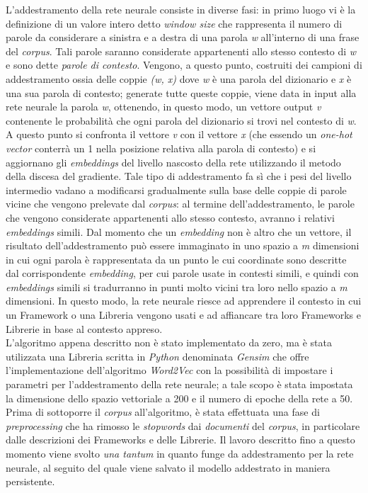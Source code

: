 L'addestramento della rete neurale consiste in diverse fasi: in primo luogo vi è la definizione di un valore intero detto \emph{window size} che rappresenta il numero di parole da considerare a sinistra e a destra di una parola \emph{w} all'interno di una frase del \emph{corpus}. Tali parole saranno considerate appartenenti allo stesso contesto di \emph{w} e sono dette \emph{parole di contesto}. Vengono, a questo punto, costruiti dei campioni di addestramento ossia delle coppie \emph{(w, x)} dove \emph{w} è una parola del dizionario e \emph{x} è una sua parola di contesto; generate tutte queste coppie, viene data in input alla rete neurale la parola \emph{w}, ottenendo, in questo modo, un vettore output \emph{v} contenente le probabilità che ogni parola del dizionario si trovi nel contesto di \emph{w}. A questo punto si confronta il vettore \emph{v} con il vettore \emph{x} (che essendo un \emph{one-hot vector} conterrà un 1 nella posizione relativa alla parola di contesto) e si aggiornano gli \emph{embeddings} del livello nascosto della rete utilizzando il metodo della discesa del gradiente. Tale tipo di addestramento fa sì che i pesi del livello intermedio vadano a modificarsi gradualmente sulla base delle coppie di parole vicine che vengono prelevate dal \emph{corpus}: al termine dell'addestramento, le parole che vengono considerate appartenenti allo stesso contesto, avranno i relativi \emph{embeddings} simili. Dal momento che un \emph{embedding} non è altro che un vettore, il risultato dell'addestramento può essere immaginato in uno spazio a \emph{m} dimensioni in cui ogni parola è rappresentata da un punto le cui coordinate sono descritte dal corrispondente \emph{embedding}, per cui parole usate in contesti simili, e quindi con \emph{embeddings} simili si tradurranno in punti molto vicini tra loro nello spazio a \emph{m} dimensioni. In questo modo, la rete neurale riesce ad apprendere il contesto in cui un Framework o una Libreria vengono usati e ad affiancare tra loro Frameworks e Librerie in base al contesto appreso.\\
L'algoritmo appena descritto non è stato implementato da zero, ma è stata utilizzata una Libreria scritta in \emph{Python} denominata \emph{Gensim} \cite{rehurek_lrec} che offre l'implementazione dell'algoritmo \emph{Word2Vec} con la possibilità di impostare i parametri per l'addestramento della rete neurale; a tale scopo è stata impostata la dimensione dello spazio vettoriale a 200 e il numero di epoche della rete a 50. Prima di sottoporre il \emph{corpus} all'algoritmo, è stata effettuata una fase di \emph{preprocessing} che ha rimosso le \emph{stopwords} dai \emph{documenti} del \emph{corpus}, in particolare dalle descrizioni dei Frameworks e delle Librerie. Il lavoro descritto fino a questo momento viene svolto \emph{una tantum} in quanto funge da addestramento per la rete neurale, al seguito del quale viene salvato il modello addestrato in maniera persistente. 
